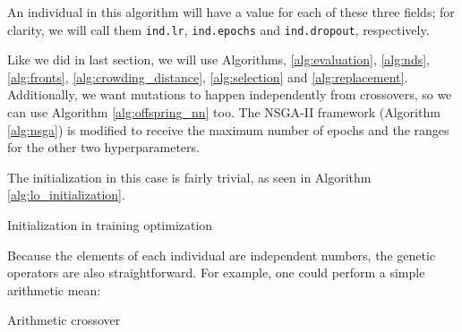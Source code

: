 	An individual in this algorithm will have a value for each of these three fields; for clarity, we will call them \texttt{ind.lr}, \texttt{ind.epochs} and \texttt{ind.dropout}, respectively.

	Like we did in last section, we will use Algorithms, \ref{alg:evaluation}, \ref{alg:nds}, \ref{alg:fronts}, \ref{alg:crowding_distance}, \ref{alg:selection} and \ref{alg:replacement}. Additionally, we want mutations to happen independently from crossovers, so we can use Algorithm \ref{alg:offspring_nn} too. The NSGA-II framework (Algorithm \ref{alg:nsga}) is modified to receive the maximum number of epochs and the ranges for the other two hyperparameters.

	The initialization in this case is fairly trivial, as seen in Algorithm \ref{alg:lo_initialization}.

	\vspace{0.3cm}

	\begin{algorithm}[H]\label{alg:lo_initialization}


		\caption{Initialization in training optimization}

	\end{algorithm}

	\vspace{0.3cm}

	Because the elements of each individual are independent numbers, the genetic operators are also straightforward. For example, one could perform a simple arithmetic mean:

	\vspace{0.3cm}

	\begin{algorithm}[H]\label{alg:arithmeticx}


		\caption{Arithmetic crossover}

	\end{algorithm}

